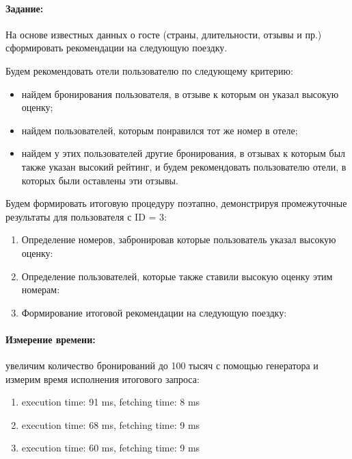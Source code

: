 \paragraph{Задание:} На основе известных данных о госте (страны, длительности, отзывы и пр.) сформировать рекомендации на следующую поездку.

\noindent Будем рекомендовать отели пользователю по следующему критерию: 

\begin{itemize}
	\item найдем бронирования пользователя, в отзыве к которым он указал высокую оценку;
	\item найдем пользователей, которым понравился тот же номер в отеле;
	\item найдем у этих пользователей другие бронирования, в отзывах к которым был также указан высокий рейтинг, и будем рекомендовать пользователю отели,  в которых были оставлены эти отзывы.
\end{itemize}

\noindent Будем формировать итоговую процедуру поэтапно, демонстрируя промежуточные результаты для пользователя с ID = 3:
\begin{enumerate}[leftmargin=0em]
	\item Определение номеров, забронировав которые пользователь указал высокую оценку:
	
	\item Определение пользователей, которые также ставили высокую оценку этим номерам: 
	
	\item Формирование итоговой рекомендации на следующую поездку:
\end{enumerate}

\paragraph{Измерение времени:} увеличим количество бронирований до 100 тысяч с помощью генератора и измерим время исполнения итогового запроса:

\begin{enumerate}
	\item execution time: 91 ms, fetching time: 8 ms
	\item execution time: 68 ms, fetching time: 9 ms
	\item execution time: 60 ms, fetching time: 9 ms
\end{enumerate}

